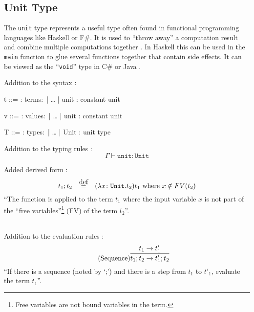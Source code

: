 \subsection{Unit Type}

The \texttt{unit} type represents a useful type often found in functional
programming languages like Haskell or F\#. It is used to ``throw away'' a
computation result and combine multiple computations together \cite{pierce2002ProgLang}.
In Haskell this can be used in the \texttt{main} function to glue
several functions together that contain side effects. It can be viewed as
the ``\texttt{void}'' type in C\# or Java \cite{pierce2002ProgLang}.

Addition to the syntax \cite{pierce2002ProgLang}:

\begin{bnfgrammar}
    t ::= : terms$\colon$
    | \dots
    | unit : constant unit
\end{bnfgrammar}\leavevmode\newline

\begin{bnfgrammar}
    v ::= : values$\colon$
    | \dots
    | unit : constant unit
\end{bnfgrammar}\leavevmode\newline

\begin{bnfgrammar}
    T ::= : types$\colon$
    | \dots
    | Unit : unit type
\end{bnfgrammar}\leavevmode\newline

Addition to the typing rules \cite{pierce2002ProgLang}:
\begin{equation*}
    \tag{Unit}
    \Gamma \vdash \texttt{unit} \colon \texttt{Unit}
\end{equation*}\leavevmode\newline

Added derived form \cite{pierce2002ProgLang}:
\begin{equation*}
    t_1 ; t_2 \quad \defeq \quad (\lambda x \colon \texttt{Unit} . t_2) t_1 \text{ where } x \notin FV(t_2)
\end{equation*}
``The function is applied to the term $t_1$ where the input variable $x$ is not
part of the ``free variables''\footnote{Free variables are not bound variables in the term.}
(FV) of the term $t_2$''.

~\\
Addition to the evaluation rules \cite{pierce2002ProgLang}:
\begin{equation*}
    \tag{Sequence}
    \infer{
        t_1 ; t_2 \rightarrow t'_1 ; t_2
    }{
        t_1 \rightarrow t'_1
    }
\end{equation*}
``If there is a sequence (noted by `;') and there is a step from $t_1$ to
$t'_1$, evaluate the term $t_1$''.

